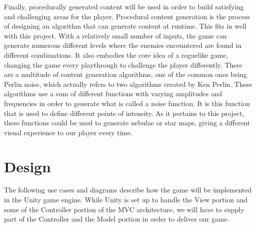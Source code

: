\documentclass[12pt]{article}       %
\def\hs{\hspace{15pt}}
\begin{document}
	Finally, procedurally generated content will be used in order to build satisfying and challenging areas for the player. Procedural content generation is the process of designing an algorithm that can generate content at runtime. This fits in well with this project. With a relatively small number of inputs, the game can generate numerous different levels where the enemies encountered are found in different combinations. It also embodies the core idea of a roguelike game, changing the game every playthrough to challenge the player differently. There are a multitude of content generation algorithms, one of the common ones being Perlin noise, which actually refers to two algorithms created by Ken Perlin. These algorithms use a sum of different functions with varying amplitudes and frequencies in order to generate what is called a noise function. It is this function that is used to define different points of intensity. As it pertains to this project, these functions could be used to generate nebulae or star maps, giving a different visual experience to our player every time. \cite{PCG}

\section{Design}
\label{sec:Design}

\hs The following use cases and diagrams describe how the game will be implemented in the Unity game engine. While Unity is set up to handle the View portion and some of the Controller portion of the MVC architecture, we will have to supply part of the Controller and the Model portion in order to deliver our game.
\end{document}
